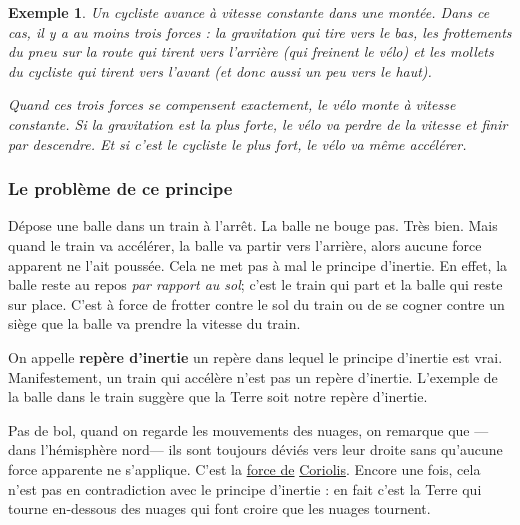 \documentclass[a4paper,12pt]{book}
\theoremstyle{mes_exemples}	\newtheorem{exemple}[numtho]{Exemple}
\theoremstyle{mes_tho}
\newcommand{\defe}[2]{\textbf{#1}\index{#2}}
\begin{document}
\begin{exemple}
Un cycliste avance à vitesse constante dans une montée. Dans ce cas, il y a au moins trois forces : la gravitation qui tire vers le bas, les frottements du pneu sur la route qui tirent vers l'arrière (qui freinent le vélo) et les mollets du cycliste qui tirent vers l'avant (et donc aussi un peu vers le haut).

 Quand ces trois forces se compensent exactement, le vélo monte à vitesse constante. Si la gravitation est la plus forte, le vélo va perdre de la vitesse et finir par descendre. Et si c'est le cycliste le plus fort, le vélo va même accélérer.
\end{exemple}


\subsubsection{Le problème de ce principe}


Dépose une balle dans un train à l'arrêt. La balle ne bouge pas. Très bien. Mais quand le train va accélérer, la balle va partir vers l'arrière, alors aucune force apparent ne l'ait poussée. Cela ne met pas à mal le principe d'inertie. En effet, la balle reste au repos \emph{par rapport au sol}; c'est le train qui part et la balle qui reste sur place. C'est à force de frotter contre le sol du train ou de se cogner contre un siège que la balle va prendre la vitesse du train.

On appelle \defe{repère d'inertie}{Repère d'inertie} un repère dans lequel le principe d'inertie est vrai. Manifestement, un train qui accélère n'est pas un repère d'inertie. L'exemple de la balle dans le train suggère que la Terre soit notre repère d'inertie.

Pas de bol, quand on regarde les mouvements des nuages, on remarque que ---dans l'hémisphère nord--- ils sont toujours déviés vers leur droite sans qu'aucune force apparente ne s'applique. C'est la \href{http://fr.wikipedia.org/wiki/Force\_de\_Coriolis}{force de} \href{http://fr.wikipedia.org/wiki/Gaspard-Gustave\_Coriolis}{Coriolis}. Encore une fois, cela n'est pas en contradiction avec le principe d'inertie : en fait c'est la Terre qui tourne en-dessous des nuages qui font croire que les nuages tournent.
\end{document}
